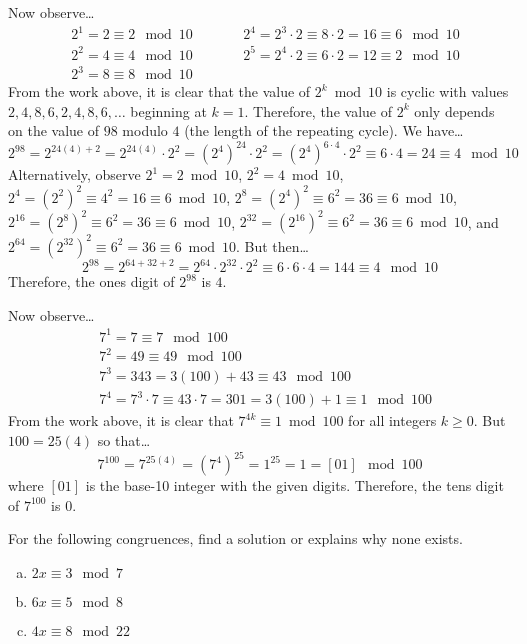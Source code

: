 \documentclass[11pt,letterpaper]{article}
\begin{document}
Now observe\dots
	\[
	\begin{aligned}
	&2^1= 2 \equiv 2 \mod 10 \qquad& &2^4= 2^3 \cdot 2 \equiv 8 \cdot 2= 16 \equiv 6 \mod 10 \\
	&2^2= 4 \equiv 4 \mod 10 		   & &2^5= 2^4 \cdot 2 \equiv 6 \cdot 2= 12 \equiv 2 \mod 10 \\
	&2^3= 8 \equiv 8 \mod 10 
	\end{aligned}
	\]
From the work above, it is clear that the value of $2^k \bmod 10$ is cyclic with values $2, 4, 8, 6, 2, 4, 8, 6, \ldots$ beginning at $k= 1$. Therefore, the value of $2^k$ only depends on the value of $98$ modulo $4$ (the length of the repeating cycle). We have\dots
	\[
	2^{98}= 2^{24(4) + 2}= 2^{24(4)} \cdot 2^2= (2^4)^{24} \cdot 2^2= (2^4)^{6 \cdot 4} \cdot 2^2 \equiv 6 \cdot 4= 24 \equiv 4 \mod 10
	\]
Alternatively, observe $2^1= 2 \bmod 10$, $2^2= 4 \bmod 10$, $2^4= (2^2)^2 \equiv 4^2= 16 \equiv 6 \bmod 10$, $2^8= (2^4)^2 \equiv 6^2= 36 \equiv 6 \bmod 10$, $2^{16}= (2^8)^2 \equiv 6^2= 36 \equiv 6 \bmod 10$, $2^{32}= (2^{16})^2 \equiv 6^2= 36 \equiv 6 \bmod 10$, and $2^{64}= (2^{32})^2 \equiv 6^2= 36 \equiv 6 \bmod 10$. But then\dots
	\[
	2^{98}= 2^{64 + 32 + 2}= 2^{64} \cdot 2^{32} \cdot 2^2 \equiv 6 \cdot 6 \cdot 4= 144 \equiv 4 \mod 10
	\]
Therefore, the ones digit of $2^{98}$ is $4$. \pspace

Now observe\dots
	\[
	\begin{aligned}
	&7^1= 7 \equiv 7 \mod 100 \\
	&7^2= 49 \equiv 49 \mod 100 \\
	&7^3= 343= 3(100) + 43 \equiv 43 \mod 100 \\
	&7^4= 7^3 \cdot 7 \equiv 43 \cdot 7= 301= 3(100) + 1 \equiv 1 \mod 100
	\end{aligned}
	\]
From the work above, it is clear that $7^{4k} \equiv 1 \bmod 100$ for all integers $k \geq 0$. But $100= 25(4)$ so that\dots
	\[
	7^{100} = 7^{25(4)} = (7^4)^{25} = 1^{25}= 1 = [01] \mod 100
	\]
where $[01]$ is the base-10 integer with the given digits. Therefore, the tens digit of $7^{100}$ is $0$. 



\newpage



 For the following congruences, find a solution or explains why none exists.
\begin{enumerate}[(a)]
\item $2x \equiv 3 \mod 7$
\item $6x \equiv 5 \mod 8$
\item $4x \equiv 8 \mod 22$
\end{enumerate} \pspace
\end{document}
